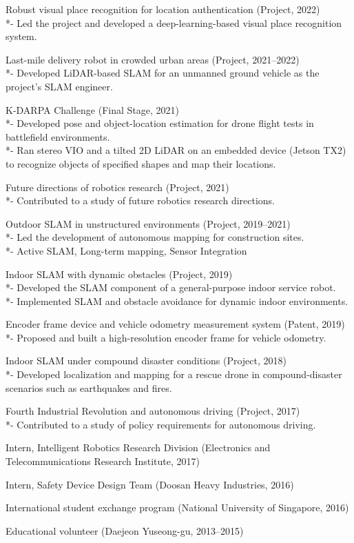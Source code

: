 \documentclass[margin]{res}
\begin{document}
\begin{resume}
		\par	Robust visual place recognition for location authentication (Project, 2022)
		\\*-	Led the project and developed a deep-learning-based visual place recognition system.
		\par	Last-mile delivery robot in crowded urban areas (Project, 2021--2022)
		\\*-	Developed LiDAR-based SLAM for an unmanned ground vehicle as the project's SLAM engineer.
		\par	K-DARPA Challenge (Final Stage, 2021)
		\\*-	Developed pose and object-location estimation for drone flight tests in battlefield environments.
		\\*-	Ran stereo VIO and a tilted 2D LiDAR on an embedded device (Jetson TX2) to recognize objects of specified shapes and map their locations.
		\par	Future directions of robotics research (Project, 2021)
		\\*-	Contributed to a study of future robotics research directions.
		\par	Outdoor SLAM in unstructured environments (Project, 2019--2021)
		\\*-	Led the development of autonomous mapping for construction sites.
		\\*-	Active SLAM, Long-term mapping, Sensor Integration
		\par	Indoor SLAM with dynamic obstacles (Project, 2019)
		\\*-	Developed the SLAM component of a general-purpose indoor service robot.
		\\*-	Implemented SLAM and obstacle avoidance for dynamic indoor environments.
		\par	Encoder frame device and vehicle odometry measurement system (Patent, 2019)
		\\*-	Proposed and built a high-resolution encoder frame for vehicle odometry.
		\par	Indoor SLAM under compound disaster conditions (Project, 2018)
		\\*-	Developed localization and mapping for a rescue drone in compound-disaster scenarios such as earthquakes and fires.
		\par	Fourth Industrial Revolution and autonomous driving (Project, 2017)
		\\*-	Contributed to a study of policy requirements for autonomous driving.
		\par	Intern, Intelligent Robotics Research Division (Electronics and Telecommunications Research Institute, 2017)
		\par	Intern, Safety Device Design Team (Doosan Heavy Industries, 2016)
		\par	International student exchange program (National University of Singapore, 2016)
		\par	Educational volunteer (Daejeon Yuseong-gu, 2013--2015)
		

\end{resume}
\end{document}
